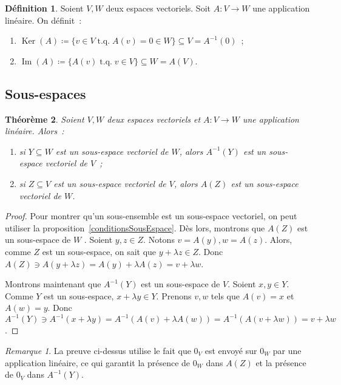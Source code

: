 \documentclass{article}
\DeclareMathOperator{\tq}{\text{ t.q. }}
\DeclareMathOperator{\Ker}{Ker}
\DeclareMathOperator{\Imf}{Im}
\newtheorem{thm}{Théorème}[section]
\theoremstyle{definition}
\newtheorem{déf}[thm]{Définition}
\theoremstyle{remark}
\newtheorem*{rmq}{Remarque}
\begin{document}
		\begin{déf} Soient $V, W$ deux espaces vectoriels. Soit $A : V \to W$ une application linéaire. On définit~:
		\begin{enumerate}
			\item $\Ker(A) \coloneqq \{v \in V \tq A(v) = 0 \in W\} \subseteq V = A^{-1}(0)$~;
			\item $\Imf(A) \coloneqq \{A(v) \tq v \in V\} \subseteq W = A(V)$.
		\end{enumerate}
		\end{déf}

	\subsection{Sous-espaces}
		\begin{thm}\label{sousEspacesApplicationLinéaire} Soient $V, W$ deux espaces vectoriels et $A : V \to W$ une application linéaire. Alors~:
		\begin{enumerate}
			\item si $Y \subseteq W$ est un sous-espace vectoriel de $W$, alors $A^{-1}(Y)$ est un sous-espace vectoriel de $V$~;
			\item si $Z \subseteq V$ est un sous-espace vectoriel de $V$, alors $A(Z)$ est un sous-espace vectoriel de $W$.
		\end{enumerate}
		\end{thm}

		\begin{proof} Pour montrer qu'un sous-ensemble est un sous-espace vectoriel, on peut utiliser la proposition~\ref{conditionsSousEspace}. Dès lors, montrons que
		$A(Z)$ est un sous-espace de $W$ . Soient $y, z \in Z$. Notons $v = A(y), w = A(z)$. Alors, comme $Z$ est un sous-espace, on sait que $y + \lambda z \in Z$. Donc
		$A(Z) \ni A(y + \lambda z) = A(y) + \lambda A(z) = v + \lambda w$.
		
		Montrons maintenant que $A^{-1}(Y)$ est un sous-espace de $V$. Soient $x, y \in Y$. Comme $Y$ est un sous-espace, $x + \lambda y \in Y$. Prenons $v, w$ tels que
		$A(v) = x$ et $A(w) = y$. Donc $A^{-1}(Y) \ni A^{-1}(x + \lambda y) = A^{-1}(A(v) + \lambda A(w)) = A^{-1}(A(v + \lambda w)) = v+\lambda w$. \end{proof}

		\begin{rmq} La preuve ci-dessus utilise le fait que $0_V$ est envoyé sur $0_W$ par une application linéaire, ce qui garantit la présence de $0_W$ dans $A(Z)$
		et la présence de $0_V$ dans $A^{-1}(Y)$. \end{rmq}
\end{document}
